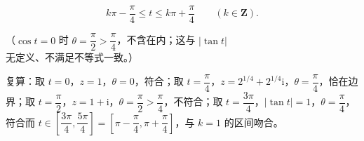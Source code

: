 \begin{answer}
\nopagebreak[4]
\[
k\pi-\frac\pi4\leqslant t\leqslant k\pi+\frac\pi4\qquad(k\in\mathbf Z).
\]

（$\cos t=0$ 时 $\theta=\dfrac\pi2>\dfrac\pi4$，不含在内；这与 $\lvert\tan t\rvert$ 无定义、不满足不等式一致。）

复算：取 $t=0$，$z=1$，$\theta=0$，符合；取 $t=\dfrac\pi4$，$z=2^{1/4}+2^{1/4}\mathrm i$，$\theta=\dfrac\pi4$，恰在边界；取 $t=\dfrac\pi2$，$z=1+\mathrm i$，$\theta=\dfrac\pi2>\dfrac\pi4$，不符合；取 $t=\dfrac{3\pi}{4}$，$\lvert\tan t\rvert=1$，$\theta=\dfrac\pi4$，符合而 $t\in\left[\dfrac{3\pi}{4},\dfrac{5\pi}{4}\right]=\left[\pi-\dfrac\pi4,\pi+\dfrac\pi4\right]$，与 $k=1$ 的区间吻合。



\end{answer}
